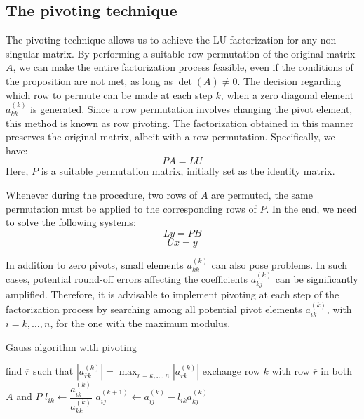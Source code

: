 \documentclass[12pt, a4paper]{report}
\begin{document}
    \subsection{The pivoting technique}
    The pivoting technique allows us to achieve the LU factorization for any non-singular matrix.
    By performing a suitable row permutation of the original matrix $A$, we can make the entire factorization process feasible, even if the conditions of the proposition are not met, as long as $\det(A) \neq 0$. 
    The decision regarding which row to permute can be made at each step $k$, when a zero diagonal element $a_{kk}^{(k)}$ is generated.
    Since a row permutation involves changing the pivot element, this method is known as row pivoting.
    The factorization obtained in this manner preserves the original matrix, albeit with a row permutation. Specifically, we have:
    \[PA=LU\]
    Here, $P$ is a suitable permutation matrix, initially set as the identity matrix. 
    
    Whenever during the procedure, two rows of $A$ are permuted, the same permutation must be applied to the corresponding rows of $P$.
    In the end, we need to solve the following systems:
    \[Ly=PB\]
    \[Ux=y\]

    In addition to zero pivots, small elements $a_{kk}^{(k)}$ can also pose problems.
    In such cases, potential round-off errors affecting the coefficients $a_{kj}^{(k)}$ can be significantly amplified.
    Therefore, it is advisable to implement pivoting at each step of the factorization process by searching among all potential pivot elements $a_{ik}^{(k)}$, with $i=k,\dots,n$, for the one with the maximum modulus.
    \begin{algorithm}[H]
        \caption{Gauss algorithm with pivoting}
            \begin{algorithmic}[1]
                    \State find $\overline{r}$ such that $\left\lvert a_{\overline{r}k}^{(k)} \right\rvert=\max_{r=k,\dots,n}\left\lvert a_{rk}^{(k)} \right\rvert$
                    \State exchange row $k$ with row $\overline{r}$ in both $A$ and $P$
                        \State $l_{ik} \leftarrow \dfrac{a_{ik}^{(k)}}{a_{kk}^{(k)}}$
                            \State $a_{ij}^{(k+1)} \leftarrow a_{ij}^{(k)}-l_{ik}a_{kj}^{(k)}$
                        \EndFor
                    \EndFor
                \EndFor
            \end{algorithmic}
    \end{algorithm}
\end{document}

